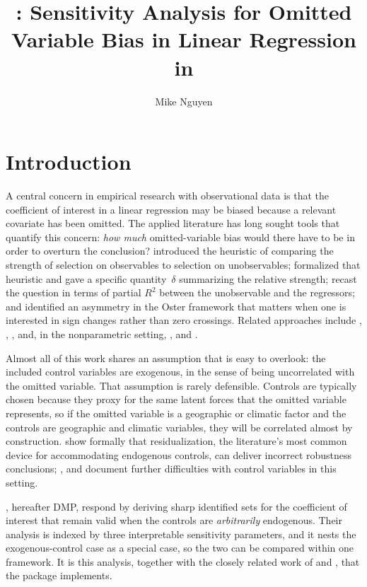 \documentclass[article]{jss}\usepackage[]{graphicx}\usepackage[]{xcolor}
\author{Mike Nguyen}
\title{\pkg{regsensitivity}: Sensitivity Analysis for Omitted Variable
       Bias in Linear Regression in \proglang{R}}
\begin{document}
\section{Introduction}\label{sec:intro}

A central concern in empirical research with observational data is that the
coefficient of interest in a linear regression may be biased because a
relevant covariate has been omitted. The applied literature has long sought
tools that quantify this concern: \emph{how much} omitted-variable bias
would there have to be in order to overturn the conclusion?
\citet{Altonji2005} introduced the heuristic of comparing the strength of
selection on observables to selection on unobservables;
\citet{Oster2019} formalized that heuristic and gave a specific
quantity~$\delta$ summarizing the relative strength; \citet{Cinelli2020}
recast the question in terms of partial $R^2$ between the unobservable and
the regressors; and \citet{Masten2026} identified an asymmetry in the Oster
framework that matters when one is interested in sign changes rather than
zero crossings. Related approaches include \citet{Imbens2003},
\citet{Hosman2010}, \citet{HsuSmall2013}, \citet{Krauth2016} and, in the
nonparametric setting, \citet{Rosenbaum2002}, \citet{Tan2006} and
\citet{Masten2018}.

Almost all of this work shares an assumption that is easy to overlook: the
included control variables are exogenous, in the sense of being uncorrelated
with the omitted variable. That assumption is rarely defensible. Controls
are typically chosen because they proxy for the same latent forces that the
omitted variable represents, so if the omitted variable is a geographic or
climatic factor and the controls are geographic and climatic variables, they
will be correlated almost by construction. \citet{Diegert2025} show
formally that residualization, the literature's most common device for
accommodating endogenous controls, can deliver incorrect robustness
conclusions; \citet{DeLuca2019}, \citet{Frolich2008} and
\citet{Hunermund2025} document further difficulties with control variables
in this setting.

\citet{Diegert2026}, hereafter DMP, respond by deriving sharp identified
sets for the coefficient of interest that remain valid when the controls
are \emph{arbitrarily} endogenous. Their analysis is indexed by three
interpretable sensitivity parameters, and it nests the exogenous-control
case as a special case, so the two can be compared within one framework.
It is this analysis, together with the closely related work of
\citet{Oster2019} and \citet{Masten2026}, that the 
package implements.
\end{document}
